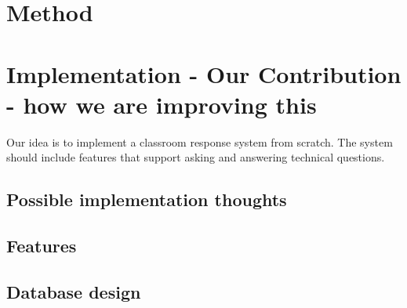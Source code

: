 \documentclass{article}
\begin{document}
\section{Method}


\section{Implementation - Our Contribution - how we are improving this}
Our idea is to implement a classroom response system from scratch. The system should include features that support asking and answering technical questions. 


\subsection{Possible implementation thoughts}

\subsection{Features} %




\subsection{Database design}










\end{document}
